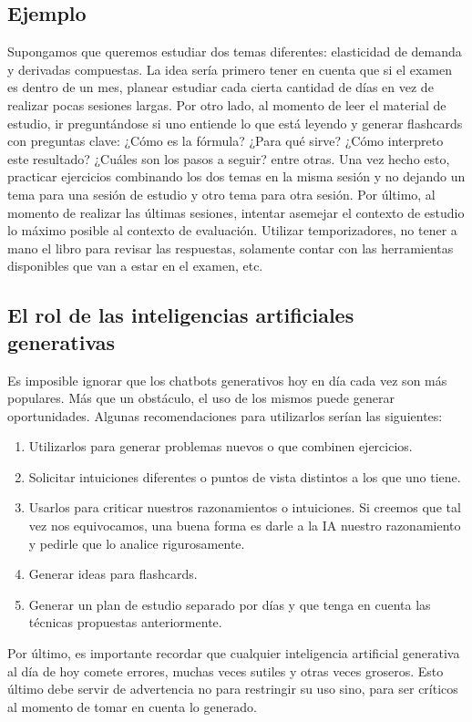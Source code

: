 \documentclass{article}
\begin{document}
\subsection*{Ejemplo}
Supongamos que queremos estudiar dos temas diferentes: elasticidad de demanda y derivadas compuestas. La idea sería primero tener en cuenta que si el examen es dentro de un mes, planear estudiar cada cierta cantidad de días en vez de realizar pocas sesiones largas. Por otro lado, al momento de leer el material de estudio, ir preguntándose si uno entiende lo que está leyendo y generar flashcards con preguntas clave: ¿Cómo es la fórmula? ¿Para qué sirve? ¿Cómo interpreto este resultado? ¿Cuáles son los pasos a seguir? entre otras. Una vez hecho esto, practicar ejercicios combinando los dos temas en la misma sesión y no dejando un tema para una sesión de estudio y otro tema para otra sesión. Por último, al momento de realizar las últimas sesiones, intentar asemejar el contexto de estudio lo máximo posible al contexto de evaluación. Utilizar temporizadores, no tener a mano el libro para revisar las respuestas, solamente contar con las herramientas disponibles que van a estar en el examen, etc.

\subsection*{El rol de las inteligencias artificiales generativas}
Es imposible ignorar que los chatbots generativos hoy en día cada vez son más populares. Más que un obstáculo, el uso de los mismos puede generar oportunidades. Algunas recomendaciones para utilizarlos serían las siguientes:

\begin{enumerate}
    \item Utilizarlos para generar problemas nuevos o que combinen ejercicios.
    \item Solicitar intuiciones diferentes o puntos de vista distintos a los que uno tiene.
    \item Usarlos para criticar nuestros razonamientos o intuiciones. Si creemos que tal vez nos equivocamos, una buena forma es darle a la IA nuestro razonamiento y pedirle que lo analice rigurosamente.
    \item Generar ideas para flashcards.
    \item Generar un plan de estudio separado por días y que tenga en cuenta las técnicas propuestas anteriormente.
\end{enumerate}
Por último, es importante recordar que cualquier inteligencia artificial generativa al día de hoy comete errores, muchas veces sutiles y otras veces groseros. Esto último debe servir de advertencia no para restringir su uso sino, para ser críticos al momento de tomar en cuenta lo generado.
\end{document}
